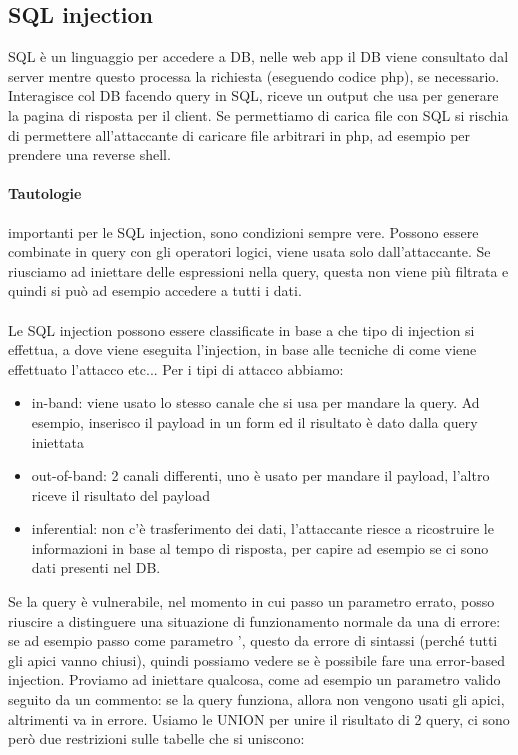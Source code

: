 \documentclass{article}
\begin{document}
\subsection{SQL injection}
SQL è un linguaggio per accedere a DB, nelle web app il DB viene consultato dal server mentre questo processa la richiesta (eseguendo codice php), se necessario. Interagisce col DB facendo query in SQL, riceve un output che usa per generare la pagina di risposta per il client. Se permettiamo di carica file con SQL si rischia di permettere all'attaccante di caricare file arbitrari in php, ad esempio per prendere una reverse shell.
\paragraph{Tautologie}importanti per le SQL injection, sono condizioni sempre vere. Possono essere combinate in query con gli operatori logici, viene usata solo dall'attaccante. Se riusciamo ad iniettare delle espressioni nella query, questa non viene più filtrata e quindi si può ad esempio accedere a tutti i dati.\\\\ Le SQL injection possono essere classificate in base a che tipo di injection si effettua, a dove viene eseguita l'injection, in base alle tecniche di come viene effettuato l'attacco etc... Per i tipi di attacco abbiamo:
\begin{itemize}
\item in-band: viene usato lo stesso canale che si usa per mandare la query. Ad esempio, inserisco il payload in un form ed il risultato è dato dalla query iniettata
\item out-of-band: 2 canali differenti, uno è usato per mandare il payload, l'altro riceve il risultato del payload
\item inferential: non c'è trasferimento dei dati, l'attaccante riesce a ricostruire le informazioni in base al tempo di risposta, per capire ad esempio se ci sono dati presenti nel DB.
\end{itemize}
Se la query è vulnerabile, nel momento in cui passo un parametro errato, posso riuscire a distinguere una situazione di funzionamento normale da una di errore: se ad esempio passo come parametro ', questo da errore di sintassi (perché tutti gli apici vanno chiusi), quindi possiamo vedere se è possibile fare una error-based injection. Proviamo ad iniettare qualcosa, come ad esempio un parametro valido seguito da un commento: se la query funziona, allora non vengono usati gli apici, altrimenti va in errore. Usiamo le UNION per unire il risultato di 2 query, ci sono però due restrizioni sulle tabelle che si uniscono:
\end{document}
